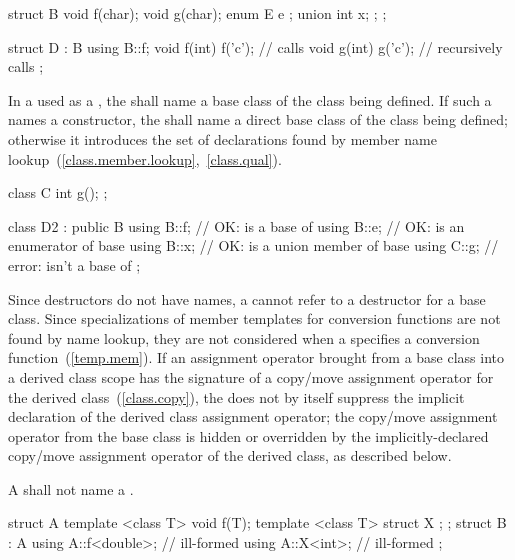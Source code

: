 \begin{codeblock}
struct B {
  void f(char);
  void g(char);
  enum E { e };
  union { int x; };
};

struct D : B {
  using B::f;
  void f(int) { f('c'); }       // calls 
  void g(int) { g('c'); }       // recursively calls 
};
\end{codeblock}
\exitexample

\pnum
In a  used as a
, the 
shall name a base class of the class being defined. If such a
 names a constructor, the
 shall name a direct base class of the class
being defined; otherwise it introduces the set of declarations found by
member name lookup~(\ref{class.member.lookup},~\ref{class.qual}).
\enterexample

\begin{codeblock}
class C {
  int g();
};

class D2 : public B {
  using B::f;                   // OK:  is a base of 
  using B::e;                   // OK:  is an enumerator of base 
  using B::x;                   // OK:  is a union member of base 
  using C::g;                   // error:  isn't a base of 
};
\end{codeblock}
\exitexample

\pnum
\enternote
Since destructors do not have names, a
 cannot refer to a
destructor for a base class. Since specializations of member templates
for conversion functions are not found by name lookup, they are not
considered when a  specifies a conversion
function~(\ref{temp.mem}).
\exitnote
If an assignment operator brought from a base class into a derived class
scope has the signature of a copy/move assignment
operator for the derived
class~(\ref{class.copy}), the  does not by
itself suppress the implicit declaration of the derived class
assignment operator; the copy/move assignment
operator from the base
class is hidden or overridden by the implicitly-declared
copy/move assignment
operator of the derived class, as described below.

\pnum
A  shall not name a .
\enterexample

\begin{codeblock}
struct A {
  template <class T> void f(T);
  template <class T> struct X { };
};
struct B : A {
  using A::f<double>;           // ill-formed
  using A::X<int>;              // ill-formed
};
\end{codeblock}
\exitexample

